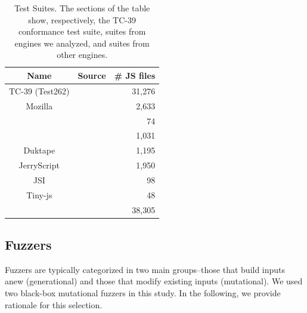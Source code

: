 \documentclass[10pt,conference,anonymous]{IEEEtran}
\begin{document}
\begin{table}[t]
  \centering
  \caption{\label{tab:test-suites}Test Suites. The sections of the
    table show, respectively, the TC-39 conformance test suite, suites
    from engines we analyzed, and suites from other engines.}
  \begin{tabular}{ccr}
    \toprule
    Name & Source & \# JS files \\
    \midrule
    TC-39 (Test262) & \cite{ecma262-conformance-suite} & 31,276 \\
    \midrule
    Mozilla & \cite{mozilla} & 2,633 \\
    \veight{} & \cite{v8} & 74 \\
    \jsc{} & \cite{webkit} & 1,031 \\
    \midrule    
    Duktape & \cite{duktape} & 1,195 \\ 
    JerryScript & \cite{jerryscript} & 1,950 \\
    JSI & \cite{jsi} & 98 \\
    Tiny-js & \cite{tinyjs} & 48 \\    
    \midrule
     &  & 38,305 \\
   \bottomrule     
  \end{tabular}
\end{table}


\subsection{Fuzzers}
\label{sec:objects:fuzzers}


Fuzzers are typically categorized in two main groups--those that build
inputs anew (generational) and those that modify existing inputs
(mutational). We used two black-box mutational
fuzzers
in this study. In the following, we provide rationale for this
selection.
\end{document}
